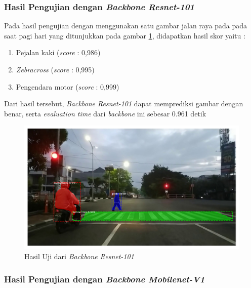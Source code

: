 \subsubsection{Hasil Pengujian dengan \textit{Backbone Resnet-101}}

Pada hasil pengujian dengan menggunakan satu gambar jalan raya pada pada saat pagi hari yang ditunjukkan pada gambar \ref{fig:hasil-resnet101}, didapatkan hasil skor yaitu :
\begin{enumerate}[nolistsep]
	\item Pejalan kaki (\textit{score} : 0,986)
	\item \textit{Zebracross} (\textit{score} : 0,995)
	\item Pengendara motor (\textit{score} : 0,999)
\end{enumerate}
Dari hasil tersebut, \textit{Backbone Resnet-101} dapat memprediksi gambar dengan benar, serta \textit{evaluation time} dari \textit{backbone} ini sebesar 0.961 detik
\begin{figure}[h] 
	\centering
	\includegraphics[scale=0.3]{gambar/fajar-frame800-resnet101.png}
	\caption{Hasil Uji dari \textit{Backbone Resnet-101}}
	\label{fig:hasil-resnet101}
\end{figure}

\subsubsection{Hasil Pengujian dengan \textit{Backbone Mobilenet-V1}}

